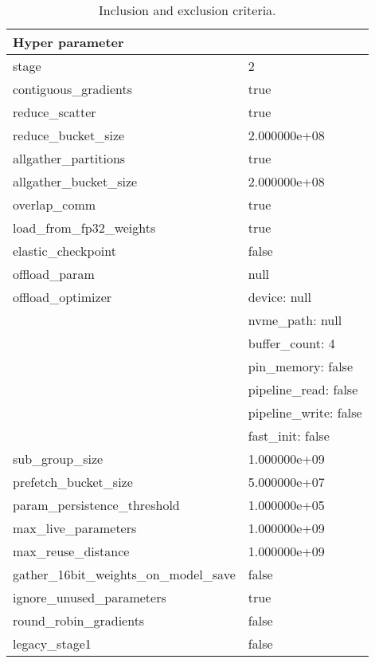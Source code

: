 \begin{table}
    \def\arraystretch{1.5}
    \small
    \centering
    \caption{Inclusion and exclusion criteria.}
    \label{tab:inclusion-exclusion-criteria}
    \begin{tabularx}{\textwidth}{XX}
        \toprule
        \textbf{Hyper parameter} & \\
        \midrule
        stage & 2\\
        contiguous\_gradients & true\\
        reduce\_scatter & true\\
        reduce\_bucket\_size & 2.000000e+08\\
        allgather\_partitions & true\\
        allgather\_bucket\_size & 2.000000e+08\\
        overlap\_comm & true\\
        load\_from\_fp32\_weights & true\\
        elastic\_checkpoint & false\\
        offload\_param & null\\
        \midrule
        offload\_optimizer & device: null\\
        & nvme\_path: null\\
        & buffer\_count: 4\\
        & pin\_memory: false\\
        & pipeline\_read: false\\
        & pipeline\_write: false\\
        & fast\_init: false\\
        \midrule
        sub\_group\_size & 1.000000e+09\\
        prefetch\_bucket\_size & 5.000000e+07\\
        param\_persistence\_threshold & 1.000000e+05\\
        max\_live\_parameters & 1.000000e+09\\
        max\_reuse\_distance & 1.000000e+09\\
        gather\_16bit\_weights\_on\_model\_save & false\\
        ignore\_unused\_parameters & true\\
        round\_robin\_gradients & false\\
        legacy\_stage1 & false\\
        \bottomrule
    \end{tabularx}
\end{table}



